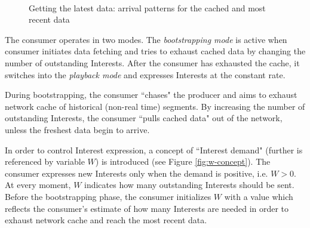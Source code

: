 \documentclass{icn/sig-alternate-2012} %
\newcommand{\wConcept}{Interest demand}
\begin{document}


\begin{figure}[t!]
\centering

\\

\caption{Getting the latest data: arrival patterns for the cached and most recent data}
\label{fig:inter-arrival}
\end{figure}

The consumer operates in two modes. The \textit{bootstrapping mode} is active when consumer initiates data fetching and tries to exhaust cached data by changing the number of outstanding Interests. After the consumer has exhausted the cache, it switches into the \textit{playback mode} and expresses Interests at the constant rate.

During bootstrapping, the consumer ``chases" the producer and aims to exhaust network cache of historical (non-real time) segments. By increasing the number of outstanding Interests, the consumer ``pulls cached data" out of the network, unless the freshest data begin to arrive. 

In order to control Interest expression, a concept of ``\wConcept{}" (further is referenced by variable $W$) is introduced (see Figure \ref{fig:w-concept}). The consumer expresses new Interests only when the demand is positive, i.e. $W > 0$. At every moment, $W$ indicates how many outstanding Interests should be sent. Before the bootstrapping phase, the consumer initializes $W$ with a value which reflects the consumer's estimate of how many Interests are needed in order to exhaust network cache and reach the most recent data.  
\end{document}
